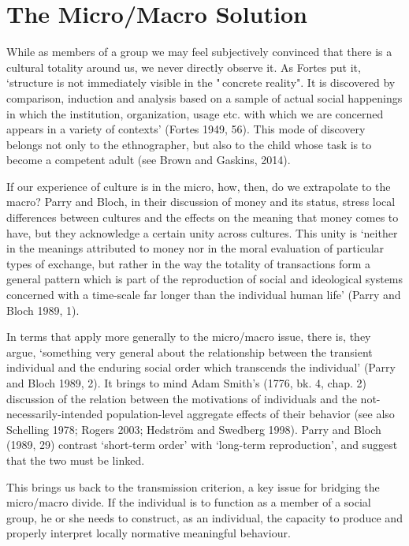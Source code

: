 
\chapter{The Micro/Macro Solution}


While as members of a group we may feel subjectively convinced that 
there is a cultural totality around us, we never directly observe it. As 
Fortes put it, \textquoteleft structure is not immediately visible in the "\,concrete 
reality". It is discovered by comparison, induction and analysis based 
on a sample of actual social happenings in which the institution, 
organization, usage etc. with which we are concerned appears in a 
variety of contexts' (Fortes 1949, 56). This mode of discovery belongs 
not only to the ethnographer, but also to the child whose task is to 
become a competent adult (see Brown and Gaskins, 2014). 



If our experience of culture is in the micro, how, then, do we 
extrapolate to the macro? Parry and Bloch, in their discussion of money 
and its status, stress local differences between cultures and the 
effects on the meaning that money comes to have, but they acknowledge a 
certain unity across cultures. This unity is \textquoteleft neither in the meanings 
attributed to money nor in the moral evaluation of particular types of 
exchange, but rather in the way the totality of transactions form a 
general pattern which is part of the reproduction of social and 
ideological systems concerned with a time-scale far longer than the 
individual human life' (Parry and Bloch 1989, 1). 



In terms that apply more generally to the micro/macro issue, there is, 
they argue, \textquoteleft something very general about the relationship between the 
transient individual and the enduring social order which transcends the 
individual' (Parry and Bloch 1989, 2). It brings to mind Adam Smith's 
(1776, bk. 4, chap. 2) discussion of the relation between the 
motivations of individuals and the not-necessarily-intended 
population-level aggregate effects of their behavior (see also Schelling 
1978; Rogers 2003; Hedstr\"{o}m and Swedberg 1998). Parry and Bloch (1989, 
29) contrast \textquoteleft short-term order' with \textquoteleft long-term reproduction', and 
suggest that the two must be linked. 



This brings us back to the transmission criterion, a key issue for 
bridging the micro/macro divide. If the individual is to function as a 
member of a social group, he or she needs to construct, as an 
individual, the capacity to produce and properly interpret locally 
normative meaningful behaviour. 



